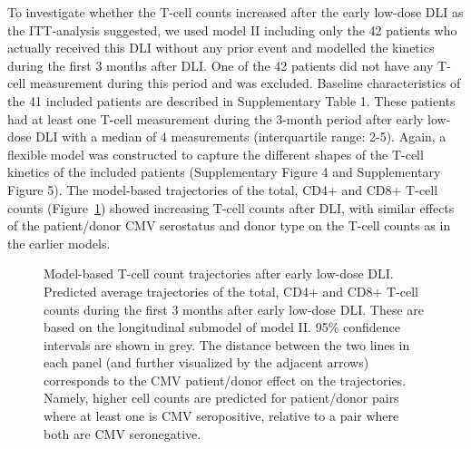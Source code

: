 \documentclass[
  letterpaper,
  paper=240mm:170mm,
  twoside=true,
  open=right,
  fontsize=10pt,
  pagesize=false,
  BCOR=15mm,
  DIV=14,
  headinclude=true,
  footinclude=false,
  headsepline=on]{scrbook}
\begin{document}
To investigate whether the T-cell counts increased after the early
low-dose DLI as the ITT-analysis suggested, we used model II including
only the 42 patients who actually received this DLI without any prior
event and modelled the kinetics during the first 3 months after DLI. One
of the 42 patients did not have any T-cell measurement during this
period and was excluded. Baseline characteristics of the 41 included
patients are described in Supplementary Table 1. These patients had at
least one T-cell measurement during the 3-month period after early
low-dose DLI with a median of 4 measurements (interquartile range: 2-5).
Again, a flexible model was constructed to capture the different shapes
of the T-cell kinetics of the included patients (Supplementary Figure 4
and Supplementary Figure 5). The model-based trajectories of the total,
CD4+ and CD8+ T-cell counts (Figure~\ref{fig-DLI-four}) showed
increasing T-cell counts after DLI, with similar effects of the
patient/donor CMV serostatus and donor type on the T-cell counts as in
the earlier models.

\begin{figure}


\caption{\label{fig-DLI-four}Model-based T-cell count trajectories after
early low-dose DLI. Predicted average trajectories of the total, CD4+
and CD8+ T-cell counts during the first 3 months after early low-dose
DLI. These are based on the longitudinal submodel of model II. 95\%
confidence intervals are shown in grey. The distance between the two
lines in each panel (and further visualized by the adjacent arrows)
corresponds to the CMV patient/donor effect on the trajectories. Namely,
higher cell counts are predicted for patient/donor pairs where at least
one is CMV seropositive, relative to a pair where both are CMV
seronegative.}

\end{figure}%
\end{document}

